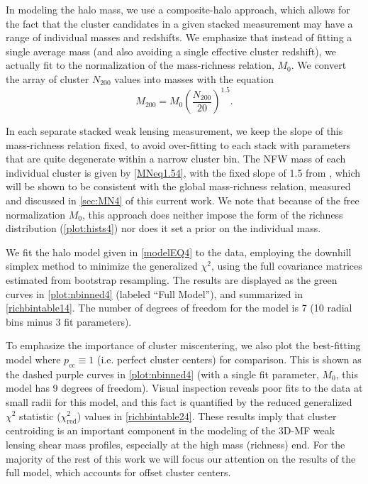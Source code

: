 In modeling the halo mass, we use a composite-halo approach, which allows for the fact that the cluster candidates in a given stacked measurement may have a range of individual masses and redshifts. We emphasize that instead of fitting a single average mass (and also avoiding a single effective cluster redshift), we actually fit to the normalization of the mass-richness relation, $M_0$. We convert the array of cluster $N_{200}$ values into masses with the equation
\begin{equation}
\label{MNeq1.54}
M_{200} = M_0 \left( \frac{N_{200}}{20} \right)^{1.5}.
\end{equation}

In each separate stacked weak lensing measurement, we keep the slope of this mass-richness relation fixed, to avoid over-fitting to each stack with parameters that are quite degenerate within a narrow cluster bin. The \ac{NFW} mass of each individual cluster is given by \autoref{MNeq1.54}, with the fixed slope of 1.5 from \citet{Ford14}, which will be shown to be consistent with the global mass-richness relation, measured and discussed in \autoref{sec:MN4} of this current work. We note that because of the free normalization $M_0$, this approach does neither impose the form of the richness distribution (\autoref{plot:hists4}) nor does it set a prior on the individual mass.

We fit the halo model given in \autoref{modelEQ4} to the data, employing the downhill simplex method to minimize the generalized $\chi^2$, using the full covariance matrices estimated from bootstrap resampling. The results are displayed as the green curves in \autoref{plot:nbinned4} (labeled ``Full Model''), and summarized in \autoref{richbintable14}. The number of degrees of freedom for the model is 7 (10 radial bins minus 3 fit parameters). 

To emphasize the importance of cluster miscentering, we also plot the best-fitting model where $p_{\mathrm{cc}} \equiv 1$ (i.e. perfect cluster centers) for comparison. This is shown as the dashed purple curves in \autoref{plot:nbinned4} (with a single fit parameter, $M_0$, this model has 9 degrees of freedom). Visual inspection reveals poor fits to the data at small radii for this model, and this fact is quantified by the reduced generalized $\chi^2$ statistic ($\chi^2_{\mathrm{red}}$) values in \autoref{richbintable24}. These results imply that cluster centroiding is an important component in the modeling of the \ac{3D-MF} weak lensing shear mass profiles, especially at the high mass (richness) end. For the majority of the rest of this work we will focus our attention on the results of the full model, which accounts for offset cluster centers.

